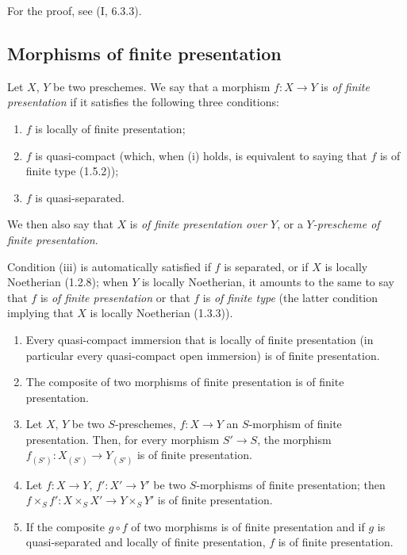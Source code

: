 For the proof, see (I, 6.3.3).

\subsection{Morphisms of finite presentation}
\label{subsection:IV.1.6}

\begin{definition}[1.6.1]
\label{IV.1.6.1}
Let $X$, $Y$ be two preschemes. We say that a morphism $f:X\to Y$ is
\emph{of finite presentation} if it satisfies the following three conditions:
\begin{enumerate}
  \item[(i)] $f$ is locally of finite presentation;
  \item[(ii)] $f$ is quasi-compact (which, when (i) holds, is equivalent
  to saying that $f$ is of finite type (1.5.2));
  \item[(iii)] $f$ is quasi-separated.
\end{enumerate}
We then also say that $X$ is \emph{of finite presentation over $Y$}, or a
\emph{$Y$-prescheme of finite presentation}.
\end{definition}

Condition (iii) is automatically satisfied if $f$ is separated, or if $X$
is locally Noetherian (1.2.8); when $Y$ is locally Noetherian, it
amounts to the same to say that $f$ is \emph{of finite presentation} or that
$f$ is \emph{of finite type} (the latter condition implying that $X$ is
locally Noetherian (1.3.3)).


\begin{proposition}[1.6.2]
\label{IV.1.6.2}
\begin{enumerate}
  \item[(i)] Every quasi-compact immersion that is locally of finite
  presentation (in particular every quasi-compact open immersion) is of
  finite presentation.
  \item[(ii)] The composite of two morphisms of finite presentation is of
  finite presentation.
  \item[(iii)] Let $X$, $Y$ be two $S$-preschemes, $f:X\to Y$ an
  $S$-morphism of finite presentation. Then, for every morphism $S'\to S$,
  the morphism $f_{(S')}:X_{(S')}\to Y_{(S')}$ is of finite presentation.
  \item[(iv)] Let $f:X\to Y$, $f':X'\to Y'$ be two $S$-morphisms of finite
  presentation; then
  $f\times_Sf':X\times_SX'\to Y\times_SY'$ is of finite presentation.
  \item[(v)] If the composite $g\circ f$ of two morphisms is of finite
  presentation and if $g$ is quasi-separated and locally of finite
  presentation, $f$ is of finite presentation.
\end{enumerate}
\end{proposition}


